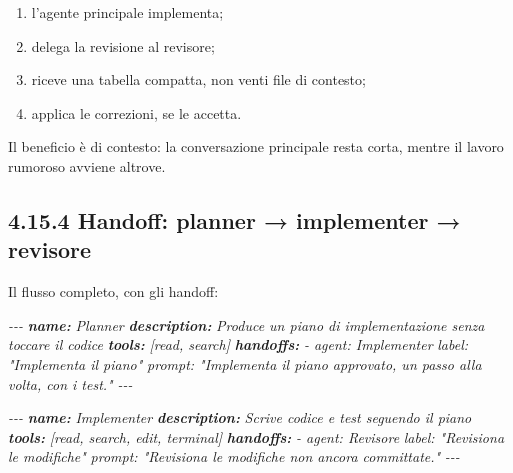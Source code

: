 \documentclass[
  italian,
  10pt,
]{book}
\newenvironment{Shaded}{\begin{snugshade}}{\end{snugshade}}
\newcommand{\AnnotationTok}[1]{\textcolor[rgb]{0.56,0.35,0.01}{\textbf{\textit{#1}}}}
\newcommand{\CommentTok}[1]{\textcolor[rgb]{0.56,0.35,0.01}{\textit{#1}}}
\providecommand{\tightlist}{%
  \setlength{\itemsep}{0pt}\setlength{\parskip}{0pt}}
\begin{document}
\begin{enumerate}
\def\labelenumi{\arabic{enumi}.}
\tightlist
\item
  l'agente principale implementa;
\item
  delega la revisione al revisore;
\item
  riceve una tabella compatta, non venti file di contesto;
\item
  applica le correzioni, se le accetta.
\end{enumerate}

Il beneficio è di contesto: la conversazione principale resta corta,
mentre il lavoro rumoroso avviene altrove.

\subsection{4.15.4 Handoff: planner → implementer →
revisore}\label{handoff-planner-implementer-revisore}

Il flusso completo, con gli handoff:

\begin{Shaded}
\begin{Highlighting}[]
\CommentTok{{-}{-}{-}}
\AnnotationTok{name:}\CommentTok{ Planner}
\AnnotationTok{description:}\CommentTok{ Produce un piano di implementazione senza toccare il codice}
\AnnotationTok{tools:}\CommentTok{ [\textquotesingle{}read\textquotesingle{}, \textquotesingle{}search\textquotesingle{}]}
\AnnotationTok{handoffs:}
\CommentTok{  {-} agent: Implementer}
\CommentTok{    label: "Implementa il piano"}
\CommentTok{    prompt: "Implementa il piano approvato, un passo alla volta, con i test."}
\CommentTok{{-}{-}{-}}
\end{Highlighting}
\end{Shaded}

\begin{Shaded}
\begin{Highlighting}[]
\CommentTok{{-}{-}{-}}
\AnnotationTok{name:}\CommentTok{ Implementer}
\AnnotationTok{description:}\CommentTok{ Scrive codice e test seguendo il piano}
\AnnotationTok{tools:}\CommentTok{ [\textquotesingle{}read\textquotesingle{}, \textquotesingle{}search\textquotesingle{}, \textquotesingle{}edit\textquotesingle{}, \textquotesingle{}terminal\textquotesingle{}]}
\AnnotationTok{handoffs:}
\CommentTok{  {-} agent: Revisore}
\CommentTok{    label: "Revisiona le modifiche"}
\CommentTok{    prompt: "Revisiona le modifiche non ancora committate."}
\CommentTok{{-}{-}{-}}
\end{Highlighting}
\end{Shaded}
\end{document}

